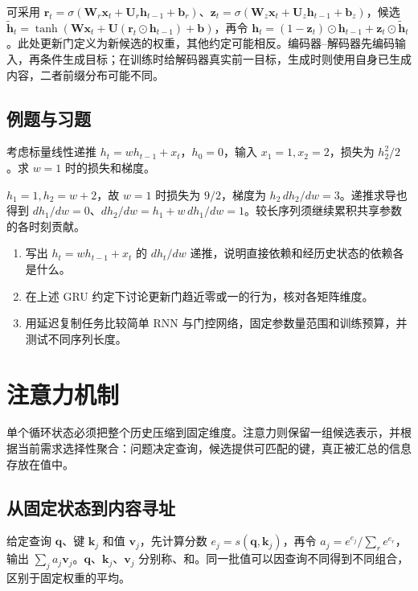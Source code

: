 \documentclass[UTF8,12pt,a4paper,fontset=fandol]{ctexbook}
\begin{document}
可采用 $\mathbf r_t=\sigma(\mathbf W_r\mathbf x_t+\mathbf U_r\mathbf h_{t-1}+\mathbf b_r)$、$\mathbf z_t=\sigma(\mathbf W_z\mathbf x_t+\mathbf U_z\mathbf h_{t-1}+\mathbf b_z)$，候选 $\widetilde{\mathbf h}_t=\tanh(\mathbf W\mathbf x_t+\mathbf U(\mathbf r_t\odot\mathbf h_{t-1})+\mathbf b)$，再令 $\mathbf h_t=(1-\mathbf z_t)\odot\mathbf h_{t-1}+\mathbf z_t\odot\widetilde{\mathbf h}_t$。此处更新门定义为新候选的权重，其他约定可能相反。编码器--解码器先编码输入，再条件生成目标；在训练时给解码器真实前一目标，生成时则使用自身已生成内容，二者前缀分布可能不同。

\section{例题与习题}
\begin{example}[共享权重的时间梯度]
考虑标量线性递推 $h_t=wh_{t-1}+x_t$，$h_0=0$，输入 $x_1=1,x_2=2$，损失为 $h_2^2/2$。求 $w=1$ 时的损失和梯度。
\end{example}
\begin{solve}
$h_1=1,h_2=w+2$，故 $w=1$ 时损失为 $9/2$，梯度为 $h_2\,dh_2/dw=3$。递推求导也得到 $dh_1/dw=0$、$dh_2/dw=h_1+w\,dh_1/dw=1$。较长序列须继续累积共享参数的各时刻贡献。
\end{solve}
\begin{enumerate}
\item 写出 $h_t=wh_{t-1}+x_t$ 的 $dh_t/dw$ 递推，说明直接依赖和经历史状态的依赖各是什么。
\item 在上述 GRU 约定下讨论更新门趋近零或一的行为，核对各矩阵维度。
\item 用延迟复制任务比较简单 RNN 与门控网络，固定参数量范围和训练预算，并测试不同序列长度。
\end{enumerate}

\chapter{注意力机制}
\label{chap:dl-attention}
单个循环状态必须把整个历史压缩到固定维度。注意力则保留一组候选表示，并根据当前需求选择性聚合：问题决定查询，候选提供可匹配的键，真正被汇总的信息存放在值中。

\section{从固定状态到内容寻址}
给定查询 $\mathbf q$、键 $\mathbf k_j$ 和值 $\mathbf v_j$，先计算分数 $e_j=s(\mathbf q,\mathbf k_j)$，再令 $a_j=e^{e_j}/\sum_re^{e_r}$，输出 $\sum_ja_j\mathbf v_j$。$\mathbf q$、$\mathbf k_j$、$\mathbf v_j$ 分别称、和。同一批值可以因查询不同得到不同组合，区别于固定权重的平均。
\end{document}
